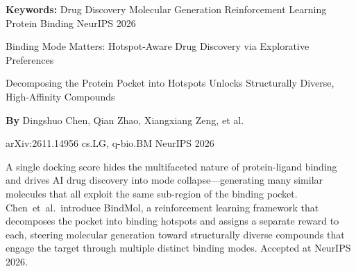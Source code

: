 \documentclass[10pt,twocolumn]{article}
\begin{document}
\setlength{\parindent}{0pt}
\setlength{\parskip}{4pt}

{\small\color{keywordgray}\textbf{Keywords:}
  Drug Discovery \textbullet{} Molecular Generation \textbullet{} Reinforcement Learning \textbullet{} Protein Binding \textbullet{} NeurIPS 2026}\par\vspace{4pt}

{\LARGE\bfseries\raggedright Binding Mode Matters: Hotspot-Aware Drug Discovery via Explorative Preferences}\par\vspace{4pt}
{\large\itshape\raggedright Decomposing the Protein Pocket into Hotspots Unlocks Structurally Diverse, High-Affinity Compounds}\par\vspace{6pt}
{\small\textbf{By} Dingshuo Chen, Qian Zhao, Xiangxiang Zeng, et al.}\par\vspace{2pt}
{\small\color{keywordgray}arXiv:2611.14956 \textbullet{} cs.LG, q-bio.BM \textbullet{} NeurIPS 2026}
\par\vspace{2pt}\noindent{\color{rulered}\rule{\columnwidth}{0.6pt}}\vspace{6pt}

A single docking score hides the multifaceted nature of protein-ligand binding and drives AI drug discovery into mode collapse---generating many similar molecules that all exploit the same sub-region of the binding pocket.
Chen~et~al.\ introduce BindMol, a reinforcement learning framework that decomposes the pocket into binding hotspots and assigns a separate reward to each, steering molecular generation toward structurally diverse compounds that engage the target through multiple distinct binding modes.
Accepted at NeurIPS 2026.
\end{document}
